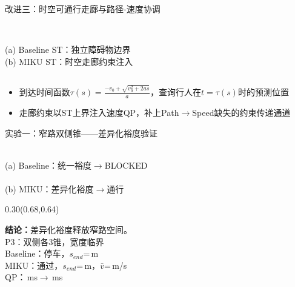 \documentclass[aspectratio=169,10pt,fontset=none]{ctexbeamer}
\begin{document}
\begin{frame}{改进三：时空可通行走廊与路径-速度协调}
\begin{columns}[T,onlytextwidth]
  \centering
  \\[2pt]
  {\footnotesize (a) Baseline ST：独立障碍物边界}
  \centering
  \\[2pt]
  {\footnotesize (b) MIKU ST：时空走廊约束注入}
\end{columns}
\vspace{0.3em}
\small
\begin{itemize}\setlength\itemsep{2pt}
  \item 到达时间函数$\tau(s)=\frac{-v_0+\sqrt{v_0^2+2as}}{a}$，查询行人在$t{=}\tau(s)$时的预测位置
  \item 走廊约束以ST上界注入速度QP，补上Path$\to$Speed缺失的约束传递通道
\end{itemize}
\end{frame}

\begin{frame}{实验一：窄路双侧锥——差异化裕度验证}
\vspace{-0.4em}

\begin{center}
  \resizebox{0.50\paperwidth}{!}{}\\[-3pt]
  {\footnotesize (a) Baseline：统一裕度$\to$BLOCKED}\\[1pt]
  \resizebox{0.50\paperwidth}{!}{}\\[-3pt]
  {\footnotesize (b) MIKU：差异化裕度$\to$通行}
\end{center}

\begin{textblock*}{0.30\paperwidth}(0.68\paperwidth,0.64\paperheight)
  \begin{tcolorbox}[slideMetricCard,title=关键指标]
    \scriptsize\raggedright
    \textbf{结论：}差异化裕度释放窄路空间。\\
    P3：双侧各3锥，宽度临界\\
    Baseline：停车，$s_{end}$=\MThreeBaselineSEnd\,m\\
    MIKU：通过，$s_{end}$=\MThreeMikuSEnd\,m，$\bar{v}$=\MThreeMikuAvgV\,m/s\\
    QP：\MThreeBaselineQpTotal\,ms$\to$\MThreeMikuQpTotal\,ms
  \end{tcolorbox}
\end{textblock*}
\end{frame}
\end{document}
